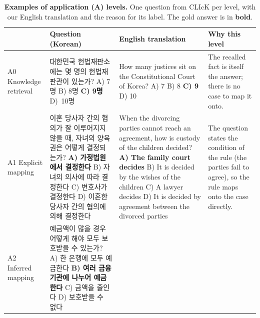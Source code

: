 \begin{table}[t]
\centering
\small
\caption{\textbf{Examples of application (A) levels.}
One question from CLIcK per level, with our English translation and the reason for its label.
The gold answer is in \textbf{bold}.}
\label{tab:a_examples}
\begin{tabular}{@{}p{}p{}p{}p{}@{}}
\toprule
 & \textbf{Question (Korean)} & \textbf{English translation} & \textbf{Why this level} \\
\midrule
A0 \newline Knowledge retrieval
& 대한민국 헌법재판소에는 몇 명의 헌법재판관이 있는가?
\newline A) 7명 \quad B) 8명 \quad \textbf{C) 9명} \quad \mbox{D) 10명}
& How many justices sit on the Constitutional Court of Korea?
\newline A) 7 \quad B) 8 \quad \textbf{C) 9} \quad D) 10
& The recalled fact is itself the answer; there is no case to map it onto. \\
\midrule
A1 \newline Explicit mapping
& 이혼 당사자 간의 협의가 잘 이루어지지 않을 때, 자녀의 양육권은 어떻게 결정되는가?
\newline \textbf{A) 가정법원에서 결정한다}
\newline B) 자녀의 의사에 따라 결정한다
\newline C) 변호사가 결정한다
\newline D) 이혼한 당사자 간의 협의에 의해 결정한다
& When the divorcing parties cannot reach an agreement, how is custody of the children decided?
\newline \textbf{A) The family court decides}
\newline B) It is decided by the wishes of the children
\newline C) A lawyer decides
\newline D) It is decided by agreement between the divorced parties
& The question states the condition of the rule (the parties fail to agree), so the rule maps onto the case directly. \\
\midrule
A2 \newline Inferred mapping
& 예금액이 많을 경우 어떻게 해야 모두 보호받을 수 있는가?
\newline A) 한 은행에 모두 예금한다
\newline \textbf{B) 여러 금융 기관에 나누어 예금한다}
\newline C) 금액을 줄인다
\newline D) 보호받을 수 없다

\end{tabular}
\end{table}
